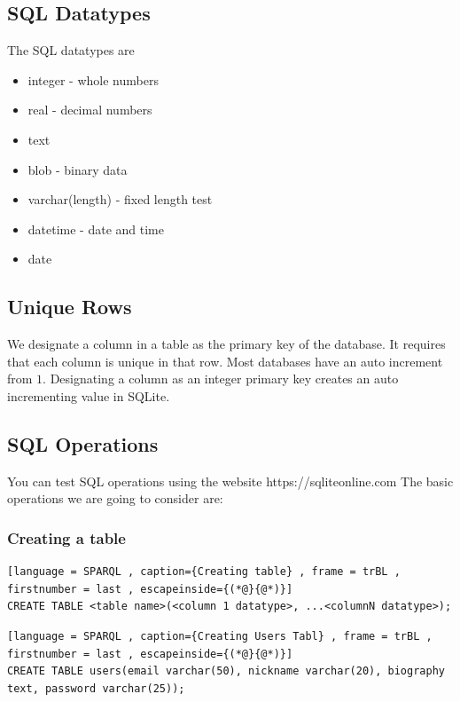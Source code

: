 \documentclass[a4paper]{article}
\theoremstyle{plain}
\theoremstyle{definition}
\newtheorem{exmp}{Example}[section]
\theoremstyle{remark}
\begin{document}
\begin{flushleft}
\subsection{SQL Datatypes}
The SQL datatypes are
\begin{itemize}
	\item integer - whole numbers
	\item real - decimal numbers
	\item text
\item blob - binary data
\item varchar(length) - fixed length test
	\item datetime - date and time
	\item date
\end{itemize}
\subsection{Unique Rows}
We designate a column in a table as the primary key of the database. It requires that each column is unique in that row. Most databases have an auto increment from $1$. Designating a column as an integer primary key creates an auto incrementing value in SQLite. 
\subsection{SQL Operations}
You can test SQL operations using the website https://sqliteonline.com
The basic operations we are going to consider are:
\subsubsection{Creating a table}
\begin{lstlisting}[language = SPARQL , caption={Creating table} , frame = trBL , firstnumber = last , escapeinside={(*@}{@*)}]
CREATE TABLE <table name>(<column 1 datatype>, ...<columnN datatype>);
\end{lstlisting}
\begin{tcolorbox}[colback=black!3!white,colframe=black!60!white,title=\begin{exmp}Creating users table \label{Creating users table}\end{exmp}]
\begin{lstlisting}[language = SPARQL , caption={Creating Users Tabl} , frame = trBL , firstnumber = last , escapeinside={(*@}{@*)}]
CREATE TABLE users(email varchar(50), nickname varchar(20), biography text, password varchar(25));
\end{lstlisting}        


\end{tcolorbox}
\end{flushleft}
\end{document}
